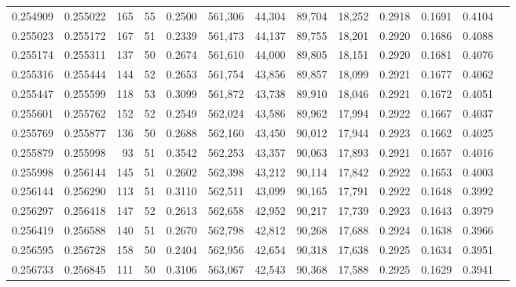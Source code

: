 \begin{tabular}{rrrrrrrrrrrrr}
0.254909 & 0.255022 &   165 &  55 &                                     0.2500 & 561,306 &  44,304 &  89,704 &  18,252 & 0.2918 & 0.1691 & 0.4104 \\
0.255023 & 0.255172 &   167 &  51 &                                     0.2339 & 561,473 &  44,137 &  89,755 &  18,201 & 0.2920 & 0.1686 & 0.4088 \\
0.255174 & 0.255311 &   137 &  50 &                                     0.2674 & 561,610 &  44,000 &  89,805 &  18,151 & 0.2920 & 0.1681 & 0.4076 \\
0.255316 & 0.255444 &   144 &  52 &                                     0.2653 & 561,754 &  43,856 &  89,857 &  18,099 & 0.2921 & 0.1677 & 0.4062 \\
0.255447 & 0.255599 &   118 &  53 &                                     0.3099 & 561,872 &  43,738 &  89,910 &  18,046 & 0.2921 & 0.1672 & 0.4051 \\
0.255601 & 0.255762 &   152 &  52 &                                     0.2549 & 562,024 &  43,586 &  89,962 &  17,994 & 0.2922 & 0.1667 & 0.4037 \\
0.255769 & 0.255877 &   136 &  50 &                                     0.2688 & 562,160 &  43,450 &  90,012 &  17,944 & 0.2923 & 0.1662 & 0.4025 \\
0.255879 & 0.255998 &    93 &  51 &                                     0.3542 & 562,253 &  43,357 &  90,063 &  17,893 & 0.2921 & 0.1657 & 0.4016 \\
0.255998 & 0.256144 &   145 &  51 &                                     0.2602 & 562,398 &  43,212 &  90,114 &  17,842 & 0.2922 & 0.1653 & 0.4003 \\
0.256144 & 0.256290 &   113 &  51 &                                     0.3110 & 562,511 &  43,099 &  90,165 &  17,791 & 0.2922 & 0.1648 & 0.3992 \\
0.256297 & 0.256418 &   147 &  52 &                                     0.2613 & 562,658 &  42,952 &  90,217 &  17,739 & 0.2923 & 0.1643 & 0.3979 \\
0.256419 & 0.256588 &   140 &  51 &                                     0.2670 & 562,798 &  42,812 &  90,268 &  17,688 & 0.2924 & 0.1638 & 0.3966 \\
0.256595 & 0.256728 &   158 &  50 &                                     0.2404 & 562,956 &  42,654 &  90,318 &  17,638 & 0.2925 & 0.1634 & 0.3951 \\
0.256733 & 0.256845 &   111 &  50 &                                     0.3106 & 563,067 &  42,543 &  90,368 &  17,588 & 0.2925 & 0.1629 & 0.3941 \\

\end{tabular}
